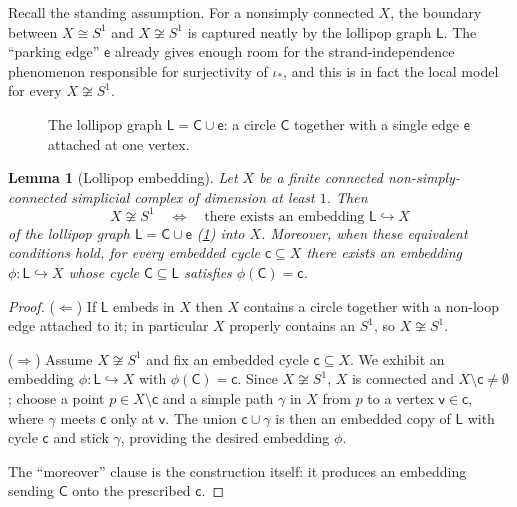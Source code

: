 \documentclass[reqno]{amsart}
\newtheorem{lemma}[theorem]{Lemma}
\theoremstyle{definition}
\newcommand\sfv{\mathsf{v}}
\newcommand{\Lollipop}{\mathsf{L}}
\numberwithin{equation}{section}
\begin{document}
Recall the standing assumption. For a nonsimply connected \(X\), the boundary between \(X\cong S^1\) and \(X\not\cong S^1\) is captured
neatly by the lollipop graph \(\Lollipop\). The ``parking edge'' \(\mathsf{e}\)
already gives enough room for the strand-independence phenomenon
responsible for surjectivity of \(\iota_\ast\), and this is in fact
the local model for every \(X\not\cong S^1\).

\begin{figure}[ht]
\centering
{}
\caption{The lollipop graph
\(\Lollipop = \mathsf{C}\cup \mathsf{e}\): a circle \(\mathsf{C}\)
together with a single edge \(\mathsf{e}\) attached at one vertex.}
\label{fig:lollipop}
\end{figure}

\begin{lemma}[Lollipop embedding]\label{lem:lollipop-embed}
Let \(X\) be a finite connected non-simply-connected simplicial
complex of dimension at least \(1\). Then
\[
X \not\cong S^1 \quad\Longleftrightarrow\quad
\text{there exists an embedding } \Lollipop
\hookrightarrow X
\]
of the lollipop graph
\(\Lollipop = \mathsf{C}\cup \mathsf{e}\) (\cref{fig:lollipop})
into \(X\). Moreover, when these equivalent conditions hold, for
every embedded cycle \(\mathsf{c}\subseteq X\) there
exists an embedding \(\phi\colon \Lollipop \hookrightarrow X\) whose
cycle \(\mathsf{C}\subseteq \Lollipop\) satisfies
\(\phi(\mathsf{C}) = \mathsf{c}\).
\end{lemma}

\begin{proof}
(\(\Leftarrow\)) If \(\Lollipop\) embeds in \(X\) then \(X\) contains a
circle together with a non-loop edge attached to it; in particular
\(X\) properly contains an \(S^1\), so \(X\not\cong S^1\).

(\(\Rightarrow\)) Assume \(X\not\cong S^1\)
and
fix an embedded cycle \(\mathsf{c}\subseteq X\).
We exhibit an embedding \(\phi\colon \Lollipop \hookrightarrow X\)
with \(\phi(\mathsf{C}) = \mathsf{c}\). Since \(X\not\cong S^1\), \(X\)
is connected and \(X\setminus \mathsf{c}\neq\emptyset\); choose a
point \(p\in X\setminus \mathsf{c}\) and a simple path \(\gamma\) in
\(X\) from \(p\) to a vertex \(\sfv\in \mathsf{c}\), where \(\gamma\) meets
\(\mathsf{c}\) only at \(\sfv\). The union \(\mathsf{c}\cup\gamma\) is then
an embedded copy of \(\Lollipop\) with cycle \(\mathsf{c}\) and stick
\(\gamma\), providing the desired embedding \(\phi\).

The ``moreover'' clause is the construction itself: it produces
an embedding sending \(\mathsf{C}\) onto the prescribed \(\mathsf{c}\).
\end{proof}
\end{document}
